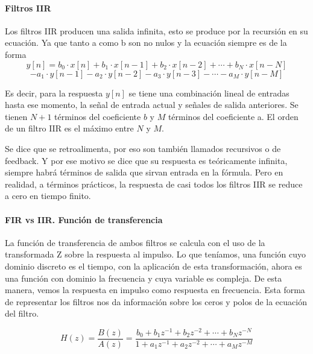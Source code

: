 \paragraph{Filtros IIR}

Los filtros IIR producen una salida infinita, esto se produce por la recursión en su ecuación. Ya que tanto a como b son no nulos y la ecuación siempre es de la forma
$$y[n] = b_0 \cdot x[n] + b_1 \cdot x[n - 1] + b_2 \cdot x[n - 2] + \cdots + b_N \cdot x[n - N]  $$
$$- a_1 \cdot y[n - 1] - a_2 \cdot y[n - 2] - a_3 \cdot y[n - 3] - \cdots - a_M \cdot y[n - M] $$
\label{eq:filterEqIIR}

Es decir, para la respuesta $y[n]$ se tiene una combinación lineal de entradas hasta ese momento, la señal de entrada actual y señales de salida anteriores. Se tienen $N+1$ términos del coeficiente $b$ y $M$ términos del coeficiente a. El orden de un filtro IIR es el máximo entre $N$ y $M$.

Se dice que se retroalimenta, por eso son también llamados recursivos o de feedback. Y por ese motivo se dice que su respuesta es teóricamente infinita, siempre habrá términos de salida que sirvan entrada en la fórmula. Pero en realidad, a términos prácticos, la respuesta de casi todos los filtros IIR se reduce a cero en tiempo finito.

\paragraph{FIR vs IIR. Función de transferencia}

La función de transferencia de ambos filtros se calcula con el uso de la transformada Z sobre la respuesta al impulso. Lo que teníamos, una función cuyo dominio discreto es el tiempo, con la aplicación de esta transformación, ahora es una función con dominio la frecuencia y cuya variable es compleja. De esta manera, vemos la respuesta en impulso como respuesta en frecuencia. Esta forma de representar los filtros nos da información sobre los ceros y polos de la ecuación del filtro. 

$$ H(z)={\frac {B(z)}{A(z)}}={\frac  {{b_{{0}}+b_{{1}}z^{{-1}}+b_{{2}}z^{{-2}}+\cdots +b_{{N}}z^{{-N}}}}{{1+a_{{1}}z^{{-1}}+a_{{2}}z^{{-2}}+\cdots +a_{{M}}z^{{-M}}}}} $$
\label{eq:filterEqFIR}

